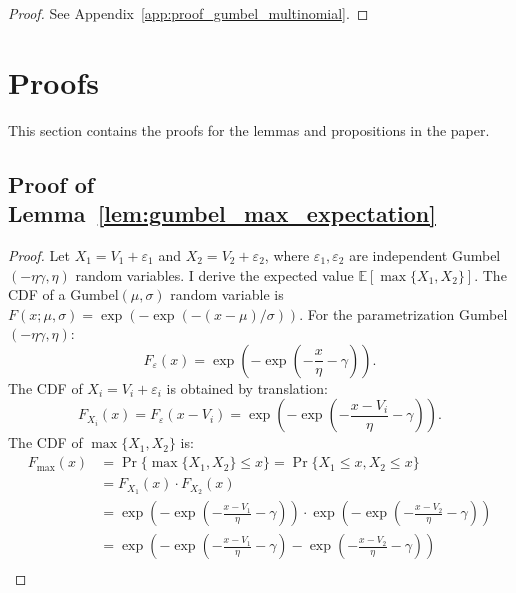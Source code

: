 \documentclass[12pt]{article}
\theoremstyle{plain}
\begin{document}
\begin{proof}
	See Appendix~\ref{app:proof_gumbel_multinomial}.
\end{proof}

\section{Proofs}\label{app:proofs}
This section contains the proofs for the lemmas and propositions in the paper.

\subsection{Proof of Lemma~\ref{lem:gumbel_max_expectation}}\label{app:proof_gumbel_max_expectation}

\begin{proof}
	Let $X_1 = V_1 + \varepsilon_1$ and $X_2 = V_2 + \varepsilon_2$, where $\varepsilon_1, \varepsilon_2$ are independent Gumbel$(-\eta\gamma, \eta)$ random variables. I derive the expected value $\mathbb{E}[\max\{X_1, X_2\}]$. The CDF of a Gumbel$(\mu, \sigma)$ random variable is $F(x; \mu, \sigma) =
		\exp(-\exp(-(x - \mu)/\sigma))$. For the parametrization Gumbel$(-\eta\gamma,
		\eta)$:
	\begin{equation*}
		F_\varepsilon(x) = \exp\left(-\exp\left(-\frac{x}{\eta} - \gamma\right)\right).
	\end{equation*}
	The CDF of $X_i = V_i + \varepsilon_i$ is obtained by translation:
	\begin{equation*}
		F_{X_i}(x) = F_\varepsilon(x - V_i) = \exp\left(-\exp\left(-\frac{x - V_i}{\eta} - \gamma\right)\right).
	\end{equation*}
	The CDF of $\max\{X_1, X_2\}$ is:
	\begin{align*}
		F_{\max}(x) & = \Pr\{\max\{X_1, X_2\} \leq x\} = \Pr\{X_1 \leq x, X_2 \leq x\}                                                                            \\
		            & = F_{X_1}(x) \cdot F_{X_2}(x)                                                                                                               \\
		            & = \exp\left(-\exp\left(-\frac{x - V_1}{\eta} - \gamma\right)\right) \cdot \exp\left(-\exp\left(-\frac{x - V_2}{\eta} - \gamma\right)\right) \\
		            & = \exp\left(-\exp\left(-\frac{x - V_1}{\eta} - \gamma\right) - \exp\left(-\frac{x - V_2}{\eta} - \gamma\right)\right)                       \\

\end{align*}
\end{proof}
\end{document}
